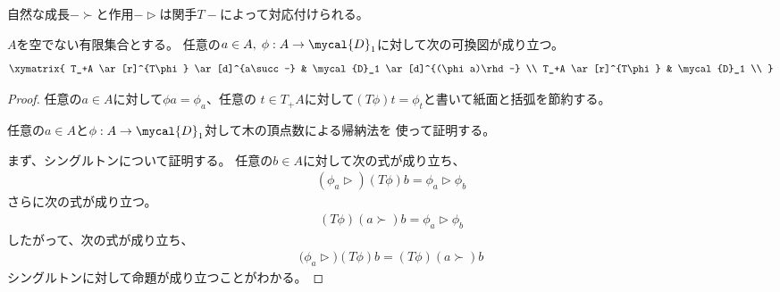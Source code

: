 自然な成長$-\succ$と作用$-\rhd$は関手$T-$によって対応付けられる。

\begin{proposition}[自然な成長と微分の部分的な対応]\label{prop:自然な成長と微分の部分的な対応} %
$A$を空でない有限集合とする。
任意の$a\in A,\;\phi:A\to\mycal{D}_1$に対して次の可換図が成り立つ。
\begin{equation*}\xymatrix{
	T_+A \ar[r]^{T\phi} \ar[d]^{a\succ-}
		& \mycal{D}_1 \ar[d]^{(\phi a)\rhd-} \\
	T_+A \ar[r]^{T\phi} & \mycal{D}_1 \\
}\end{equation*}
\end{proposition} %
\begin{proof} %
任意の$a\in A$に対して$\phi a=\phi_a$、任意の
$t\in T_+A$に対して$(T\phi)t=\phi_t$と書いて紙面と括弧を節約する。

任意の$a\in A$と$\phi:A\to\mycal{D}_1$対して木の頂点数による帰納法を
使って証明する。

まず、シングルトンについて証明する。
任意の$b\in A$に対して次の式が成り立ち、
\begin{equation*}\begin{split} %
	(\phi_a\rhd)(T\phi)b = \phi_a\rhd\phi_b
\end{split}\end{equation*} %
さらに次の式が成り立つ。
\begin{equation*}\begin{split} %
	(T\phi)(a\succ)b = \phi_a\rhd\phi_b
\end{split}\end{equation*} %
したがって、次の式が成り立ち、
\begin{equation*}\begin{split} %
	\bigl(\phi_a\rhd\bigr)(T\phi)b = (T\phi)(a\succ)b
\end{split}\end{equation*} %
シングルトンに対して命題が成り立つことがわかる。


\end{proof}
